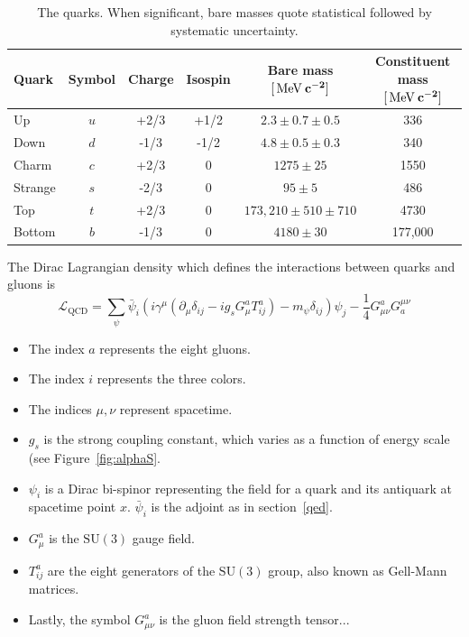 \begin{table}[ht]
  \caption{The quarks. When significant, bare masses quote statistical followed by systematic uncertainty. \label{tab:quarks}}
  \begin{center} {\scriptsize
  \begin{tabular}{|p{1.5cm}|c|c|c|c|c|}
  \hline
  \bf{Quark} & \bf{Symbol} & \bf{Charge} & \bf{Isospin} & \bf{Bare mass} $\mathbf{[\,\text{Me\hspace{-.08em}V}\:c^{-2}]}$ & \bf{Constituent mass} $\mathbf{[\,\text{Me\hspace{-.08em}V}\:c^{-2}]}$ \\
  \hline
  Up         & $u$         & {+2/3}      & +1/2         & $2.3 \pm 0.7 \pm 0.5    $  & 336                               \\
  Down       & $d$         & {-1/3}      & -1/2         & $4.8 \pm 0.5 \pm 0.3    $  & 340                               \\
  Charm      & $c$         & {+2/3}      & 0            & $1275 \pm 25            $  & 1550                              \\
  Strange    & $s$         & {-2/3}      & 0            & $95 \pm 5               $  & 486                               \\
  Top        & $t$         & {+2/3}      & 0            & $173,210 \pm 510 \pm 710$  & 4730                              \\
  Bottom     & $b$         & {-1/3}      & 0            & $4180 \pm 30            $  & 177,000                           \\
  \hline
  \end{tabular}
  }
  \end{center}
\end{table}

The Dirac Lagrangian density which defines the interactions between quarks and gluons is
\begin{equation}
\mathcal{L}_\mathrm{QCD} = \sum_{\psi} \bar{\psi}_i \left( i \gamma^\mu ( \partial_\mu \delta_{ij} - i g_s G^a_\mu T^a_{ij}) - m_\psi \delta_{ij} \right) \psi_j - \frac{1}{4} G^a_{\mu\nu} G^{\mu\nu}_a
\end{equation}


\begin{itemize}
  \setlength\itemsep{0em}
  \item The index $a$ represents the eight gluons.
  \item The index $i$ represents the three colors.
  \item The indices $\mu,\nu$ represent spacetime.
  \item $g_s$ is the strong coupling constant, which varies as a function of energy scale (see Figure~\ref{fig:alphaS}.
  \item $\psi_i$ is a Dirac bi-spinor representing the field for a quark and its antiquark at spacetime point $x$. $\bar{\psi}_i$ is the adjoint as in section~\ref{qed}.
  \item $G^a_\mu$ is the $\mathrm{SU}(3)$ gauge field.
  \item $T^a_{ij}$ are the eight generators of the $\mathrm{SU}(3)$ group, also known as Gell-Mann matrices.
  \item Lastly, the symbol $G^a_{\mu\nu}$ is the gluon field strength tensor...
\end{itemize}

